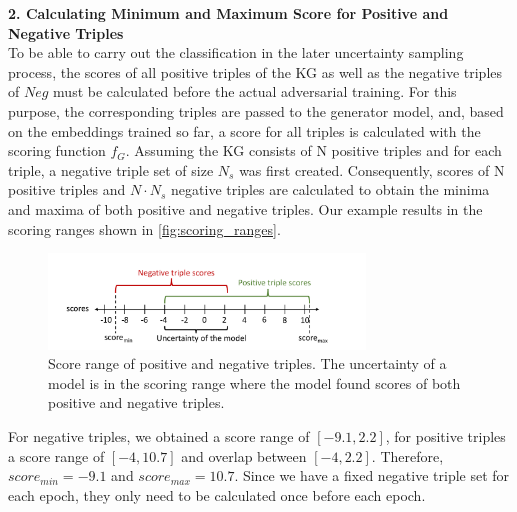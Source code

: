 \textbf{2. Calculating Minimum and Maximum Score for Positive and Negative Triples}\\
%
To be able to carry out the classification in the later uncertainty sampling process, the scores of all positive triples of the \ac{KG} as well as the negative triples of $Neg$ must be calculated before the actual adversarial training.
For this purpose, the corresponding triples are passed to the generator model, and, based on the embeddings trained so far, a score for all triples is calculated with the scoring function $f_G$.
Assuming the \ac{KG} consists of N positive triples and for each triple, a negative triple set of size $N_s$ was first created. 
Consequently, scores of N positive triples and $N \cdot N_s$ negative triples are calculated to obtain the minima and maxima of both positive and negative triples.
Our example results in the scoring ranges shown in \autoref{fig:scoring_ranges}.
\begin{figure}[t]
  \centering
    \includegraphics[width=0.75\textwidth]{figures/scoremin_scoremax_example.pdf}
  \caption{Score range of positive and negative triples.
  The uncertainty of a model is in the scoring range where the 
  model found scores of both positive and negative triples.}
  \label{fig:scoring_ranges}
\end{figure}
For negative triples, we obtained a score range of $[-9.1, 2.2]$, for positive triples a score range of $[-4, 10.7]$ and overlap between $[-4, 2.2]$.
Therefore, $score_{min} = -9.1$ and $score_{max} = 10.7$.
Since we have a fixed negative triple set for each epoch, they only need to be calculated once before each epoch.